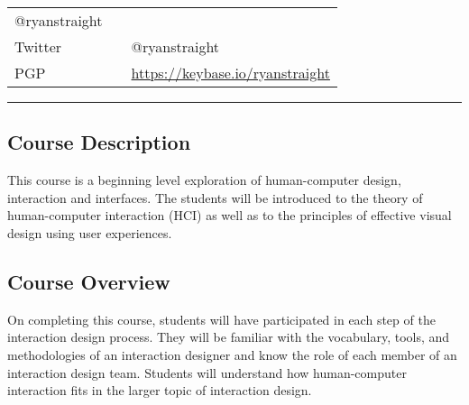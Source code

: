 \documentclass[]{article}
\begin{document}
\begin{longtable}[]{@{}lll@{}}
\begin{minipage}[t]{0.78\columnwidth}
@ryanstraight\strut
\end{minipage}\tabularnewline
\begin{minipage}[t]{0.11\columnwidth}\raggedright
Twitter\strut
\end{minipage} & \begin{minipage}[t]{0.02\columnwidth}\raggedright
\strut
\end{minipage} & \begin{minipage}[t]{0.78\columnwidth}\raggedright
@ryanstraight\strut
\end{minipage}\tabularnewline
\begin{minipage}[t]{0.11\columnwidth}\raggedright
PGP\strut
\end{minipage} & \begin{minipage}[t]{0.02\columnwidth}\raggedright
\strut
\end{minipage} & \begin{minipage}[t]{0.78\columnwidth}\raggedright
\url{https://keybase.io/ryanstraight}\strut
\end{minipage}\tabularnewline
\bottomrule
\end{longtable}

\begin{center}\rule{0.5\linewidth}{\linethickness}\end{center}

\hypertarget{course-description}{%
\subsection{Course Description}\label{course-description}}

This course is a beginning level exploration of human-computer design,
interaction and interfaces. The students will be introduced to the
theory of human-computer interaction (HCI) as well as to the principles
of effective visual design using user experiences.

\hypertarget{course-overview}{%
\subsection{Course Overview}\label{course-overview}}

On completing this course, students will have participated in each step
of the interaction design process. They will be familiar with the
vocabulary, tools, and methodologies of an interaction designer and know
the role of each member of an interaction design team. Students will
understand how human-computer interaction fits in the larger topic of
interaction design.
\end{document}
